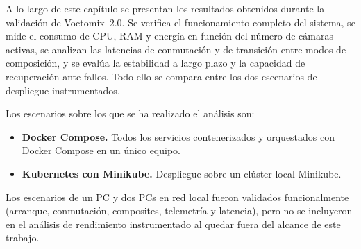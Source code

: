 A lo largo de este capítulo se presentan los resultados obtenidos durante la
validación de Voctomix~2.0. Se verifica el funcionamiento completo del sistema,
se mide el consumo de CPU, RAM y energía en función del número de cámaras activas,
se analizan las latencias de conmutación y de transición entre modos de composición,
y se evalúa la estabilidad a largo plazo y la capacidad de recuperación ante fallos.
Todo ello se compara entre los dos escenarios de despliegue instrumentados.

Los escenarios sobre los que se ha realizado el análisis son:

\begin{itemize}
  \item \textbf{Docker Compose.} Todos los servicios contenerizados y orquestados
        con Docker Compose en un único equipo.
  \item \textbf{Kubernetes con Minikube.} Despliegue sobre un clúster
        local Minikube.
\end{itemize}

Los escenarios de un PC y dos PCs en red local fueron validados funcionalmente
(arranque, conmutación, composites, telemetría y latencia), pero no se incluyeron
en el análisis de rendimiento instrumentado al quedar fuera del alcance de este
trabajo.

